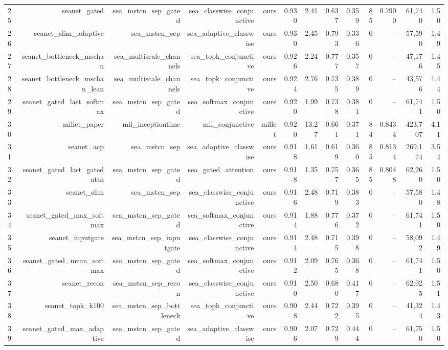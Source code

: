 \begin{table}[t]
\begin{tabular}{lrrrrrrrrrrrr}
25 & seanet\_gated & sea\_mstcn\_sep\_gated & sea\_classwise\_conjunctive & ours & 0.930 & 2.41 & 0.637 & 0.359 & 85 & 0.7900 & 61,740 & 1.50 \\
26 & seanet\_slim\_adaptive & sea\_mstcn\_sep & sea\_adaptive\_classwise & ours & 0.930 & 2.45 & 0.793 & 0.336 & 0 & -- & 57,590 & 1.49 \\
27 & seanet\_bottleneck\_mschan & sea\_multiscale\_channels & sea\_topk\_conjunctive & ours & 0.926 & 2.24 & 0.777 & 0.357 & 0 & -- & 47,176 & 1.45 \\
28 & seanet\_bottleneck\_mschan\_lean & sea\_multiscale\_channels & sea\_topk\_conjunctive & ours & 0.924 & 2.76 & 0.735 & 0.389 & 0 & -- & 43,576 & 1.44 \\
29 & seanet\_gated\_last\_softmax & sea\_mstcn\_sep\_gated & sea\_softmax\_conjunctive & ours & 0.920 & 1.99 & 0.738 & 0.381 & 0 & -- & 61,741 & 1.50 \\
30 & millet\_paper & mil\_inceptiontime & mil\_conjunctive & millet & 0.920 & 13.27 & 0.661 & 0.371 & 84 & 0.8434 & 423,707 & 4.11 \\
31 & seanet\_acp & sea\_mstcn\_sep & sea\_adaptive\_classwise & ours & 0.918 & 1.61 & 0.619 & 0.360 & 85 & 0.8134 & 269,174 & 3.54 \\
32 & seanet\_gated\_last\_gatedattn & sea\_mstcn\_sep\_gated & sea\_gated\_attention & ours & 0.918 & 1.35 & 0.757 & 0.365 & 85 & 0.8048 & 62,260 & 1.50 \\
33 & seanet\_slim & sea\_mstcn\_sep & sea\_classwise\_conjunctive & ours & 0.916 & 2.48 & 0.719 & 0.383 & 0 & -- & 57,580 & 1.48 \\
34 & seanet\_gated\_max\_softmax & sea\_mstcn\_sep\_gated & sea\_softmax\_conjunctive & ours & 0.914 & 1.88 & 0.776 & 0.372 & 0 & -- & 61,741 & 1.50 \\
35 & seanet\_inputgate & sea\_mstcn\_sep\_inputgate & sea\_classwise\_conjunctive & ours & 0.914 & 2.48 & 0.715 & 0.398 & 0 & -- & 58,092 & 1.49 \\
36 & seanet\_gated\_mean\_softmax & sea\_mstcn\_sep\_gated & sea\_softmax\_conjunctive & ours & 0.912 & 2.09 & 0.765 & 0.368 & 0 & -- & 61,741 & 1.50 \\
37 & seanet\_recon & sea\_mstcn\_sep\_recon & sea\_classwise\_conjunctive & ours & 0.910 & 2.50 & 0.680 & 0.417 & 0 & -- & 62,925 & 1.51 \\
38 & seanet\_topk\_k100 & sea\_mstcn\_sep\_bottleneck & sea\_topk\_conjunctive & ours & 0.908 & 2.44 & 0.722 & 0.395 & 0 & -- & 41,324 & 1.43 \\
39 & seanet\_gated\_max\_adaptive & sea\_mstcn\_sep\_gated & sea\_adaptive\_classwise & ours & 0.906 & 2.07 & 0.729 & 0.444 & 0 & -- & 61,750 & 1.50 \\

\end{tabular}
\end{table}
